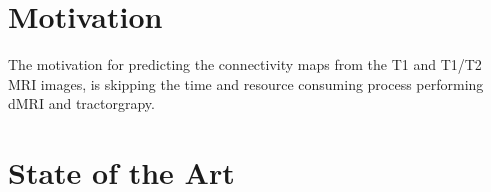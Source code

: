\section{Motivation}

The motivation for predicting the connectivity maps from the T1 and T1/T2 \ac{MRI} images, is skipping the time and resource consuming process performing \ac{dMRI} and tractorgrapy.

\section{State of the Art}





























